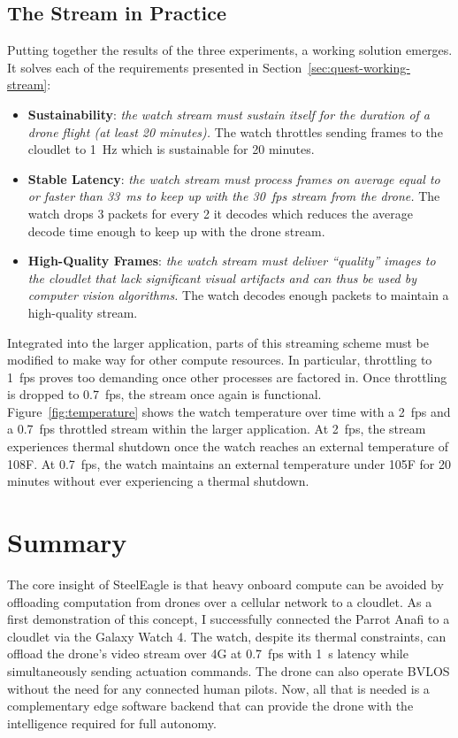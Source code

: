 \subsection{The Stream in Practice}
\label{sec:stream-in-practice}
Putting together the results of the three experiments, a working solution emerges. It solves each of the requirements presented in Section~\ref{sec:quest-working-stream}:
\begin{itemize}
    \item \textbf{Sustainability}: \textit{the watch stream must sustain itself for the duration of a drone flight (at least 20 minutes).}
    The watch throttles sending frames to the cloudlet to 1~Hz which is sustainable for 20 minutes.
    \item \textbf{Stable Latency}: \textit{the watch stream must process frames on average equal to or faster than 33~ms to keep up with the 30~fps stream from the drone.}
    The watch drops 3 packets for every 2 it decodes which reduces the average decode time enough to keep up with the drone stream.
    \item \textbf{High-Quality Frames}: \textit{the watch stream must deliver ``quality'' images to the cloudlet that lack significant visual artifacts and can thus be used by computer vision algorithms.}
    The watch decodes enough packets to maintain a high-quality stream.
\end{itemize}
Integrated into the larger application, parts of this streaming scheme must be modified to make way for other compute resources. In particular, throttling to 1~fps proves too demanding once other processes are factored in. Once throttling is dropped to 0.7~fps, the stream once again is functional. Figure~\ref{fig:temperature} shows the watch temperature over time with a 2~fps and a 0.7~fps throttled stream within the larger application. At 2~fps, the stream experiences thermal shutdown once the watch reaches an external temperature of 108\degree F. At 0.7~fps, the watch maintains an external temperature under 105\degree F for 20 minutes without ever experiencing a thermal shutdown.

\section{Summary}
The core insight of SteelEagle is that heavy onboard compute can be avoided by offloading computation from drones over a cellular network to a cloudlet. As a first demonstration of this concept, I successfully connected the Parrot Anafi to a cloudlet via the Galaxy Watch 4. The watch, despite its thermal constraints, can offload the drone's video stream over 4G at 0.7~fps with 1~s latency while simultaneously sending actuation commands. The drone can also operate BVLOS without the need for any connected human pilots. Now, all that is needed is a complementary edge software backend that can provide the drone with the intelligence required for full autonomy.
